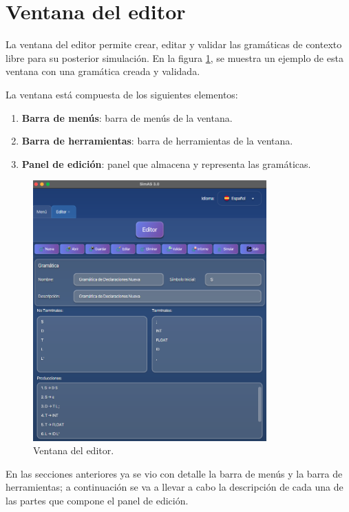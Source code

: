 \section{Ventana del editor}

La ventana del editor permite crear, editar y validar las gramáticas de contexto libre para su posterior simulación. En la figura \ref{fig:d3}, se muestra un ejemplo de esta ventana con una gramática creada y validada.

La ventana está compuesta de los siguientes elementos:
\begin{enumerate}
 \item \textbf{Barra de menús}: barra de menús de la ventana.
 \item \textbf{Barra de herramientas}: barra de herramientas de la ventana.
 \item \textbf{Panel de edición}: panel que almacena y representa las gramáticas.
\end{enumerate}

\begin{figure}[htp]
\centering
	\includegraphics[width=0.8\textwidth]{figuras2/ejemplo_practico/editor.png}
	\caption{Ventana del editor.}
	\label{fig:d3}
\end{figure}

  En las secciones anteriores ya se vio con detalle la barra de menús y la barra de herramientas; a continuación se va a llevar a cabo la descripción de cada una de las partes que compone el panel de edición.

